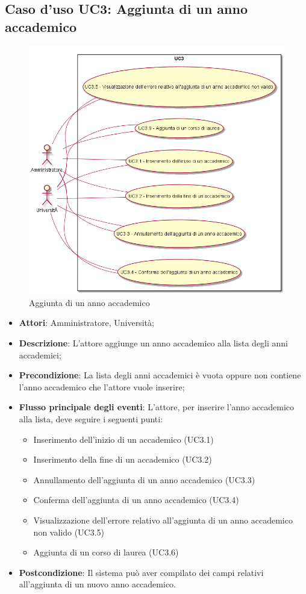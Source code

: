 \subsection{Caso d'uso \texorpdfstring{UC3}{UC3}: Aggiunta di un anno accademico}
\begin{figure} [H]
\centering
\includegraphics[scale=0.45]{./img/UC3.png}
\caption{Aggiunta di un anno accademico}\label{}
\end{figure}
\begin{itemize}
\item \textbf{Attori}: Amministratore, Università;
\item \textbf{Descrizione}: L'attore aggiunge un anno accademico alla lista degli anni accademici;
\item \textbf{Precondizione}: La lista degli anni accademici è vuota oppure non contiene l'anno accademico che l'attore vuole inserire;
\item \textbf{Flusso principale degli eventi}: L'attore, per inserire l'anno accademico alla lista, deve seguire i seguenti punti:
\begin{itemize}
\item Inserimento dell'inizio di un accademico (UC3.1)
\item Inserimento della fine di un accademico (UC3.2)
\item Annullamento dell'aggiunta di un anno accademico (UC3.3)
\item Conferma dell'aggiunta di un anno accademico (UC3.4)
\item Visualizzazione dell'errore relativo all'aggiunta di un anno accademico non valido (UC3.5)
\item Aggiunta di un corso di laurea (UC3.6)
\end{itemize}
\item \textbf{Postcondizione}: Il sistema può aver compilato dei campi relativi all'aggiunta di un nuovo anno accademico.
\end{itemize}

